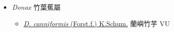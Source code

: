 
  \begin{itemize}
 \item[] \textit{Donax} 竹葉蕉屬
                                
  \begin{itemize}
        \item[] \href{http://www.theplantlist.org/tpl1.1/search?q=Donax+canniformis}{\textit{D. canniformis} (Forst.f.) K.Schum.}   蘭嶼竹芋   VU
  \end{itemize}
  \end{itemize}
